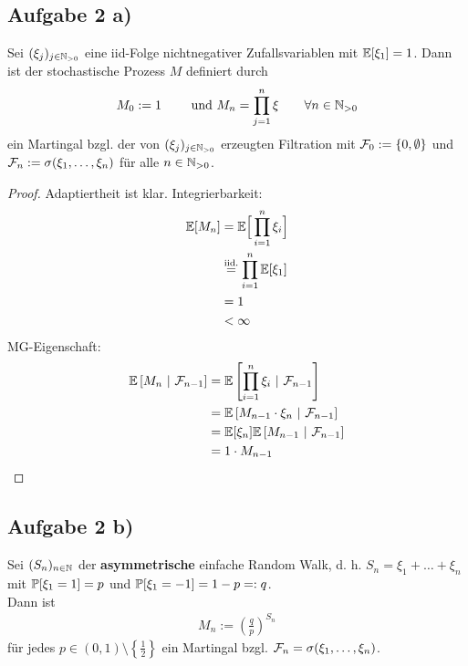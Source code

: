 \documentclass[12pt,a4paper]{article}
\begin{document}
\subsection*{Aufgabe 2 a)}
Sei $(\xi_j)_{j\in\N_{>0}}$ eine iid-Folge nichtnegativer Zufallsvariablen mit $\E[\xi_1]=1$. Dann ist der stochastische Prozess $M$ definiert durch
\begin{align*}
M_0:=1\qquad\text{ und }M_n=\prod\limits_{j=1}^n\xi\qquad\forall n\in\N_{>0}
\end{align*}
ein Martingal bzgl. der von $(\xi_j)_{j\in\N_{>0}}$ erzeugten Filtration  mit $\F_0:=\lbrace 0,\emptyset\rbrace$ und $\F_n:=\sigma(\xi_1,\ldots,\xi_n)$ für alle $n\in\N_{>0}$.

\begin{proof}
	Adaptiertheit ist klar. Integrierbarkeit:
	\begin{align*}
		\E[M_n]
		&=\E\Big[\prod_{i=1}^n \xi_i\Big] \\
		&\stackeq{\text{iid.}}\prod_{i=1}^n \E[\xi_1] \\
		&= 1 \\
		&<\infty
	\end{align*}
	MG-Eigenschaft:
	\begin{align*}
		\BedE{M_n}{\F_{n-1}}
		&= \BedE{\prod_{i=1}^n \xi_i}{\F_{n-1}} \\
		&= \BedE{M_{n-1} \cdot \xi_n}{\F_{n-1}} \\
		&= \E[\xi_n] \BedE{M_{n-1}}{\F_{n-1}} \\
		&= 1 \cdot M_{n-1}
	\end{align*}

\end{proof}

\subsection*{Aufgabe 2 b)}
Sei $(S_n)_{n\in\N}$ der \textbf{asymmetrische} einfache Random Walk, d. h. $S_n=\xi_1+\ldots+\xi_n$ mit $\P[\xi_1=1]=p$ und $\P[\xi_1=-1]=1-p=:q$.\\
Dann ist 
\begin{align*}
M_n:=\left(\frac{q}{p}\right)^{S_n}
\end{align*}
für jedes $p\in (0,1)\setminus\left\lbrace\frac{1}{2}\right\rbrace$ ein Martingal bzgl. $\F_n=\sigma(\xi_1,\ldots,\xi_n)$.
\end{document}
